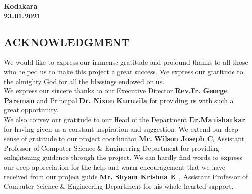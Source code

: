 \documentclass[12pt,a4paper]{report}
\begin{document}
\begin{titlepage}
\begin{center}
\begin{flushright}
 
  
\end{flushright}
\end{center}
\vspace{-12pt} 
\begin{flushleft}
\textbf{Kodakara}\\
\textbf{23-01-2021}
\end{flushleft}




\end{titlepage}





\newpage
\pagestyle{plain}

\begin{center}
\section*{ACKNOWLEDGMENT}
\end{center}
\onehalfspacing
\hspace*{0.5cm}We would like to express our immense gratitude and profound thanks to all those who helped us to make this project a great success. We express our gratitude to the almighty God for all the blessings endowed on us.\\

\hspace*{0.5cm}We express our sincere thanks to our Executive Director \textbf{Rev.Fr. George Pareman} and Principal \textbf{Dr. Nixon Kuruvila} for providing us with such a great opportunity.\\

\hspace*{0.5cm}We also convey our gratitude to our Head of the Department \textbf{Dr.Manishankar} for having given us a constant inspiration and suggestion. We extend our deep sense of gratitude to our project coordinator \textbf{Mr. Wilson Joseph C}, Assistant Professor of Computer Science \& Engineering Department for providing enlightening guidance through the project. We can hardly find words to express our deep appreciation for the help and warm encouragement that we have received from our project guide \textbf{Mr. Shyam Krishna K }, Assistant Professor of Computer Science \& Engineering Department for his whole-hearted support.\\
\end{document}
